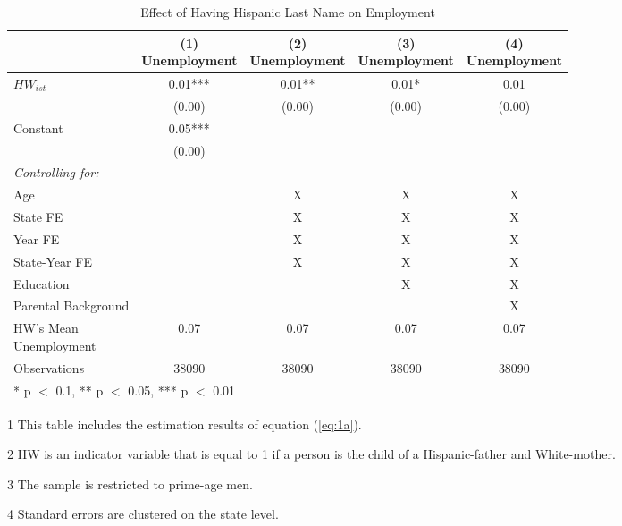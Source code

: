 \begin{table}[H]
\centering\centering
\caption{Effect of Having Hispanic Last Name on Employment \label{tab:lastnamereg-emp}}
\centering
\begin{threeparttable}
\begin{tabular}[t]{lcccc}
\toprule
  & \specialcell{(1) \\ Unemployment} & \specialcell{(2) \\ Unemployment} & \specialcell{(3) \\  Unemployment} & \specialcell{(4) \\  Unemployment}\\
\midrule
$HW_{ist}$ & \num{0.01}*** & \num{0.01}** & \num{0.01}* & \num{0.01}\\
 & (\num{0.00}) & (\num{0.00}) & (\num{0.00}) & (\num{0.00})\\
Constant & \num{0.05}*** &  &  & \\
 & (\num{0.00}) &  &  & \\
\midrule
\textit{Controlling for:} &  &  &  & \\
Age &  & X & X & X\\
State FE &  & X & X & X\\
Year FE &  & X & X & X\\
State-Year FE &  & X & X & X\\
Education &  &  & X & X\\
Parental Background &  &  &  & X\\
\specialcell{HW's Mean \\ Unemployment} & 0.07 & 0.07 & 0.07 & 0.07\\
Observations & \num{38090} & \num{38090} & \num{38090} & \num{38090}\\
\bottomrule
\multicolumn{5}{l}{\rule{0pt}{1em}* p $<$ 0.1, ** p $<$ 0.05, *** p $<$ 0.01}\\
\end{tabular}
\begin{tablenotes}
\item[1] {\footnotesize{This table includes the estimation results of equation (\ref{eq:1a}).}}
\item[2] {\footnotesize{HW is an indicator variable that is equal to 1 if a person is the child of a Hispanic-father and White-mother.}}
\item[3] {\footnotesize{The sample is restricted to prime-age men.}}
\item[4] {\footnotesize{Standard errors are clustered on the state level.}}
\end{tablenotes}
\end{threeparttable}
\end{table}
